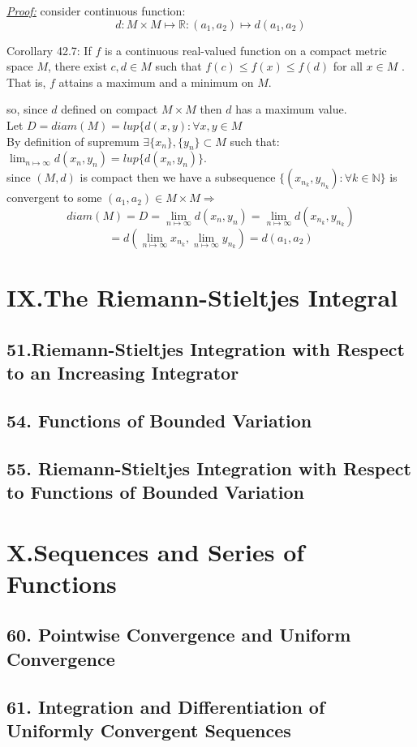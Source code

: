 \documentclass{amsbook}
\begin{document}


\begin{tcolorbox}[enhanced,attach boxed title to top center={yshift=-3mm,yshifttext=-1mm},
  colback=blue!5!white,colframe=blue!75!black,colbacktitle=red!80!black,
  title=Exercise 43.4:,fonttitle=\bfseries,
  boxed title style={size=small,colframe=red!50!black} ]
     \textit{\color{blue}\underline{Proof:}}
     consider continuous function: 
     $$d:M\times M\longmapsto\mathbb{R}:(a_1,a_2)\longmapsto d(a_1,a_2)$$
     \begin{tcolorbox}[colback=red!5!white,colframe=red!75!black]
Corollary 42.7: If $f$ is a continuous real-valued function on a compact metric space $M$, there exist $c,d\in 
M$ such that $f(c)\leq f(x)\leq f(d)$ for 
all $x\in M$ . That is, $f$ attains a maximum and a minimum on $M$.
\end{tcolorbox}
so, since $d$ defined on compact $M\times M$ then $d$ has a maximum value.\\
Let $D=diam(M)=lup\{d(x,y):\forall x,y\in M$\\
By definition of supremum $\exists \{x_n\},\{y_n\}\subset M$ such that:\\ $\lim_{n\mapsto\infty}d(x_n,y_n)=lup\{
d(x_n,y_n)\}$.\\
since $(M,d)$ is compact then we have a subsequence $\{(x_{n_k},y_{n_k}):\forall k\in\mathbb{N}\}$ is convergent
to some $(a_1,a_2)\in M\times 
M\Longrightarrow$
$$diam(M)=D=\lim_{n\mapsto\infty}d(x_n,y_n)=\lim_{n\mapsto\infty}d(x_{n_k},y_{n_k})$$
$$=d\left(\lim_{n\mapsto\infty}x_{n_k},\lim_{n\mapsto\infty}y_{n_k}\right)=d(a_1,a_2)$$
\end{tcolorbox}
\chapter{IX.The Riemann-Stieltjes Integral}
\section{51.Riemann-Stieltjes Integration with Respect to an Increasing
Integrator}
\section{54. Functions of Bounded Variation}
\section{55. Riemann-Stieltjes Integration with Respect to Functions of
Bounded Variation}
\chapter{X.Sequences and Series of Functions}
\section{60. Pointwise Convergence and Uniform Convergence}
\section{61. Integration and Differentiation of Uniformly Convergent
Sequences}




\end{document}
